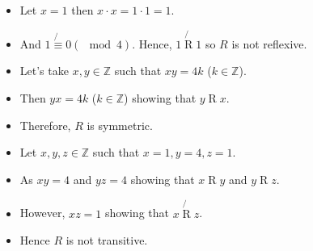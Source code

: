 \documentclass[letterpaper,12pt]{article}
\begin{document}
\begin{enumerate}
\begin{itemize}
\begin{itemize}
	\item Let $x= 1$ then $x \cdot x  = 1 \cdot 1 =1$.
	\item And $1 \not{\equiv} 0 (\mod 4)$. Hence, $1 \not{\mathrel R} 1 $ so $R$ is not reflexive.
	\item Let's take $x,y \in \mathbb{Z} $ such that $xy = 4k $ ($k\in \mathbb{Z}$).
	\item Then $yx = 4k$ ($k \in \mathbb{Z}$) showing that $y \mathrel R x$. 
	\item Therefore, $R$ is symmetric.
	\item Let $x,y,z \in \mathbb{Z}$ such that $x=1,y=4,z=1$.
	\item As $ xy= 4$ and $yz= 4$ showing that $x \mathrel R y$ and $y\mathrel R z$.
	\item However, $xz= 1$ showing that $x \not{\mathrel R} z$.
	\item Hence $R$ is not transitive.
	\end{itemize}


\end{itemize}
\end{enumerate}
\end{document}
